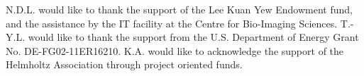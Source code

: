 \documentclass[]{iucr}              %
\begin{document}
N.D.L. would like to thank the support of the Lee Kuan Yew Endowment fund, and the assistance by the IT facility at the Centre for Bio-Imaging Sciences. T.-Y.L. would like to thank the support from the U.S. Department of Energy Grant No. DE-FG02-11ER16210. K.A. would like to acknowledge the support of the Helmholtz Association through project oriented funds.





\end{document}
